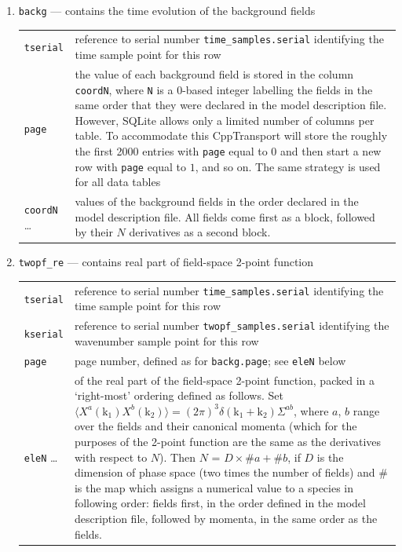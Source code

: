 \documentclass[11pt,a4paper]{article}
\newcommand{\vect}[1]{\bm{\mathrm{{#1}}}}
\newcommand{\packagefont}{\sffamily}
\newcommand{\CppTransport}{{\packagefont CppTransport}}
\newcommand{\SQLite}{{\packagefont SQLite}}
\newcommand{\semibold}[1]{{\fontseries{b}\selectfont{#1}}}
\newenvironment{sqltablelist}{\renewcommand{\arraystretch}{1.3}\small}{}
\begin{document}
\begin{sqltablelist}
\begin{enumerate}
    \item \texttt{backg} --- contains the time evolution of the background fields \\
    \label{sqltable:backg}
    \begin{tabular}{p{2.5cm}p{11.2cm}}
        \texttt{tserial} & reference to serial number
        \texttt{time_samples.serial} identifying the time sample
        point for this row \\
        \texttt{page} & the value of each background field is stored in the column
        \texttt{coordN}, where \texttt{N} is a 0-based integer
        labelling the fields in the same order that they were declared in
        the model description file. However, {\SQLite} allows only a limited number
        of columns per table. To accommodate this {\CppTransport} will store the roughly
        the first 2000 entries with \texttt{page} equal to $0$ and then
        start a new row with \texttt{page} equal to $1$, and so on.
        The same strategy is used for all data tables \\
        \texttt{coordN} \ldots & values of the background fields in the order
        declared in the model description file.
        All fields come first as a block, followed by their $N$ derivatives as a second block.
    \end{tabular}

    \item \texttt{twopf_re} --- contains real part of field-space 2-point function \\
    \begin{tabular}{p{2.5cm}p{11.2cm}}
        \texttt{tserial} & reference to serial number
        \texttt{time_samples.serial} identifying the time sample point for this row \\
        \texttt{kserial} & reference to serial number
        \texttt{twopf_samples.serial} identifying the wavenumber sample point for this row \\
        \texttt{page} & page number, defined as for \texttt{backg.page}; see
        \texttt{eleN} below \\
        \texttt{eleN} \ldots & \semibold{dimensionless components} of the real part of the field-space 2-point
        function, packed in a `right-most' ordering defined as follows.
        Set $\langle X^a(\vect{k}_1) X^b(\vect{k}_2) \rangle = (2\pi)^3 \delta(\vect{k}_1 + \vect{k}_2)
        \Sigma^{ab}$, where $a$, $b$ range over the fields and their
        canonical momenta
        (which for the purposes of the 2-point function are the same as the
        derivatives with respect to $N$).
        Then $N$ = $D \times \#a + \#b$, if $D$ is the dimension of phase
        space (two times the number of fields)
        and $\#$ is the map which assigns a numerical
        value to a species in following order:
        fields first, in the order defined in the model description file,
        followed by momenta, in the same order as the fields.
        

\end{tabular}
\end{enumerate}
\end{sqltablelist}
\end{document}
